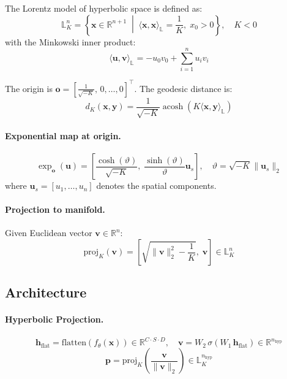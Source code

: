 \documentclass{article}
\DeclareMathOperator{\acosh}{acosh}
\newcommand{\R}{\mathbb{R}}
\newcommand{\Lo}{\mathbb{L}}
\newcommand{\bx}{\bm{x}}
\newcommand{\inner}[2]{\langle #1, #2 \rangle}
\begin{document}
The Lorentz model of hyperbolic space is defined as:
\begin{equation}
\Lo^n_K = \left\{ \bx \in \R^{n+1} \;\middle|\; \inner{\bx}{\bx}_\Lo = \frac{1}{K},\; x_0 > 0 \right\}, \quad K < 0
\end{equation}
with the Minkowski inner product:
\begin{equation}
\inner{\bm{u}}{\bm{v}}_\Lo = -u_0 v_0 + \sum_{i=1}^{n} u_i v_i
\end{equation}

The origin is $\bm{o} = \left[\frac{1}{\sqrt{-K}},\, 0, \ldots, 0\right]^\top$.
The geodesic distance is:
\begin{equation}
d_K(\bx, \bm{y}) = \frac{1}{\sqrt{-K}} \acosh\!\left(K \inner{\bx}{\bm{y}}_\Lo\right)
\end{equation}

\paragraph{Exponential map at origin.}
\begin{equation}
\exp_{\bm{o}}(\bm{u}) = \left[\frac{\cosh(\vartheta)}{\sqrt{-K}},\; \frac{\sinh(\vartheta)}{\vartheta} \bm{u}_s \right], \quad
\vartheta = \sqrt{-K} \|\bm{u}_s\|_2
\end{equation}
where $\bm{u}_s = [u_1, \ldots, u_n]$ denotes the spatial components.

\paragraph{Projection to manifold.} Given Euclidean vector $\bm{v} \in \R^n$:
\begin{equation}
\text{proj}_K(\bm{v}) = \left[\sqrt{\|\bm{v}\|_2^2 - \frac{1}{K}},\; \bm{v}\right] \in \Lo^n_K
\end{equation}

\subsection{Architecture}

\paragraph{Hyperbolic Projection.}
\begin{equation}
\bm{h}_\text{flat} = \text{flatten}(f_\theta(\bx)) \in \R^{C \cdot S \cdot D}, \quad
\bm{v} = W_2\, \sigma(W_1\, \bm{h}_\text{flat}) \in \R^{n_\text{hyp}}
\end{equation}
\begin{equation}
\bm{p} = \text{proj}_K\!\left(\frac{\bm{v}}{\|\bm{v}\|_2}\right) \in \Lo^{n_\text{hyp}}_K
\end{equation}
\end{document}

